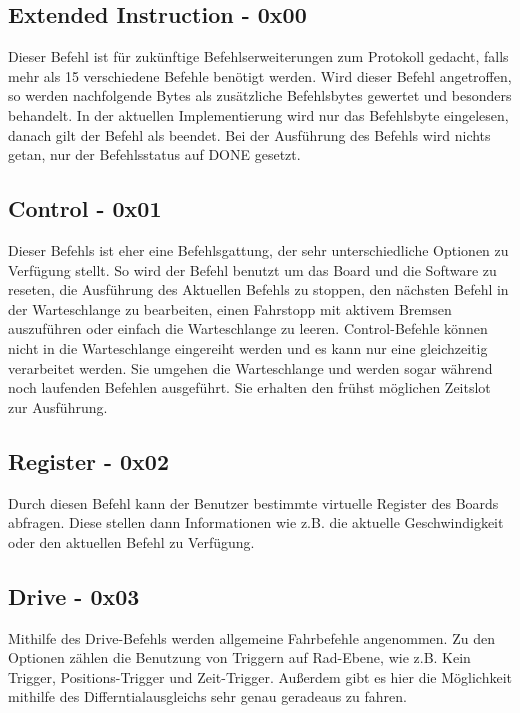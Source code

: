 \documentclass[a4paper]{article}
\begin{document}
	\subsection{Extended Instruction - 0x00}

	Dieser Befehl ist für zukünftige Befehlserweiterungen zum Protokoll gedacht, falls mehr als 15 verschiedene Befehle
	benötigt werden. Wird dieser Befehl angetroffen, so werden nachfolgende Bytes als zusätzliche Befehlsbytes gewertet
	und besonders behandelt.
	In der aktuellen Implementierung wird nur das Befehlsbyte eingelesen, danach gilt der Befehl als beendet. Bei der
	Ausführung des Befehls wird nichts getan, nur der Befehlsstatus auf DONE gesetzt.

	\subsection{Control - 0x01}

	Dieser Befehls ist eher eine Befehlsgattung, der sehr unterschiedliche Optionen zu Verfügung stellt. So wird der
	Befehl benutzt um das Board und die Software zu reseten, die Ausführung des Aktuellen Befehls zu stoppen, den
	nächsten Befehl in der Warteschlange zu bearbeiten, einen Fahrstopp mit aktivem Bremsen auszuführen oder einfach die
	Warteschlange zu leeren. 
	Control-Befehle können nicht in die Warteschlange eingereiht werden und es kann nur eine gleichzeitig verarbeitet werden.
	Sie umgehen die Warteschlange und werden sogar während noch laufenden Befehlen ausgeführt. Sie erhalten den frühst
	möglichen Zeitslot zur Ausführung.

	\subsection{Register - 0x02}

	Durch diesen Befehl kann der Benutzer bestimmte virtuelle Register des Boards abfragen. Diese stellen dann Informationen
	wie z.B. die aktuelle Geschwindigkeit oder den aktuellen Befehl zu Verfügung.

	\subsection{Drive - 0x03}

	Mithilfe des Drive-Befehls werden allgemeine Fahrbefehle angenommen. Zu den Optionen zählen die Benutzung von Triggern
	auf Rad-Ebene, wie z.B. Kein Trigger, Positions-Trigger und Zeit-Trigger. Außerdem gibt es hier die Möglichkeit
	mithilfe des Differntialausgleichs sehr genau geradeaus zu fahren.
\end{document}
